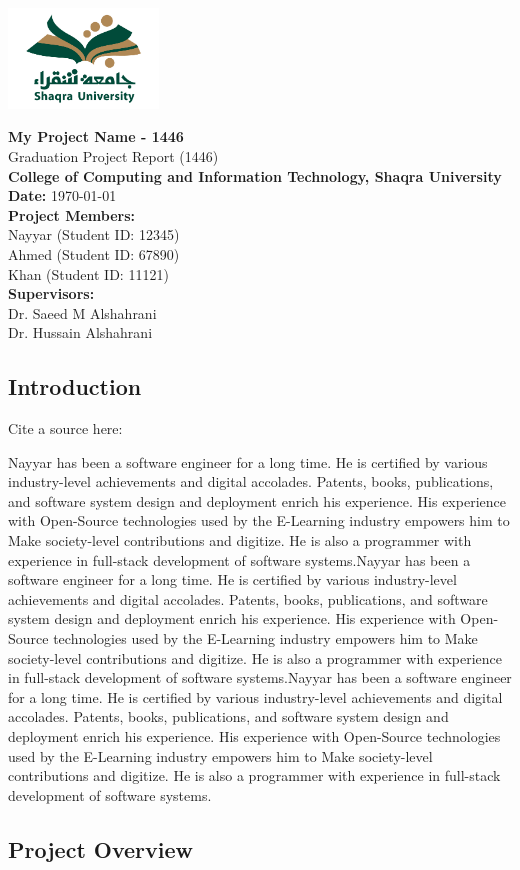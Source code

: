 \documentclass[a4paper,12pt]{report}
\newenvironment{pageborder}{
  \begin{tcolorbox}[width=\textwidth, height=\textheight, colframe=black, colback=white, sharp corners, boxrule=0.5mm, nobeforeafter]
}{
  \end{tcolorbox}
}
\newcommand{\titlepagecontent}{
  \begin{flushright}
    \includegraphics[width=4cm]{LOGO.jpg}  %
  \end{flushright}
  
  \vspace{2cm}
  
  \begin{center}
    \Huge \textbf{My Project Name - 1446} \\[0.5cm]
    \Large Graduation Project Report (1446) \\[1cm]
    \Large \textbf{College of Computing and Information Technology, Shaqra University} \\[1.5cm]
    
    \textbf{Date:} \today \\[1cm]
    
    \textbf{Project Members:} \\[0.5cm]
    Nayyar (Student ID: 12345) \\ 
    Ahmed (Student ID: 67890) \\ 
    Khan (Student ID: 11121) \\[1cm]
    
    \textbf{Supervisors:} \\[0.5cm]
    Dr. Saeed M Alshahrani \\ 
    Dr. Hussain Alshahrani \\[3cm]
  \end{center}
}
\begin{document}
\begin{pageborder}
  \titlepagecontent
\end{pageborder}

\begin{pageborder}
  \tableofcontents
\end{pageborder}

\begin{pageborder}
  \chapter{Introduction}
  \lipsum[1-2]  %
  Cite a source here: \cite{example_reference}
\end{pageborder}
\begin{pageborder}
    Nayyar has been a software engineer for a long time. He is certified by various industry-level achievements and digital accolades. Patents, books, publications, and software system design and deployment enrich his experience. His experience with Open-Source technologies used by the E-Learning industry empowers him to Make society-level contributions and digitize. He is also a programmer with experience in full-stack development of software systems.Nayyar has been a software engineer for a long time. He is certified by various industry-level achievements and digital accolades. Patents, books, publications, and software system design and deployment enrich his experience. His experience with Open-Source technologies used by the E-Learning industry empowers him to Make society-level contributions and digitize. He is also a programmer with experience in full-stack development of software systems.Nayyar has been a software engineer for a long time. He is certified by various industry-level achievements and digital accolades. Patents, books, publications, and software system design and deployment enrich his experience. His experience with Open-Source technologies used by the E-Learning industry empowers him to Make society-level contributions and digitize. He is also a programmer with experience in full-stack development of software systems.
\end{pageborder}

\begin{pageborder}
  \chapter{Project Overview}
  \lipsum[3-5]  %
\end{pageborder}
\end{document}

